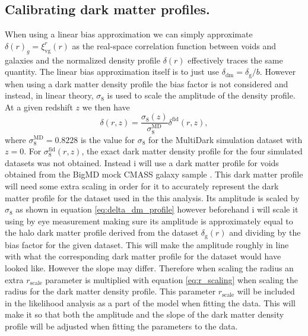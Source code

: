 \subsection{Calibrating dark matter profiles.}\label{sec:dm_calibrate}
When using a linear bias approximation we can simply approximate $\delta(r)_g=\xi_{\mathrm{vg}}^r(r)$ as the real-space correlation function between voids and galaxies and the normalized density profile $\delta(r)$ effectively traces the same quantity. The linear bias approximation itself is to just use $\delta_{\mathrm{dm}}=\delta_\mathrm{g}/b$. However when using a dark matter density profile the bias factor is not considered and instead, in linear theory, $\sigma_8$ is used to scale the amplitude of the density profile. At a given redshift $z$ we then have
\begin{equation}\label{eq:delta_dm_profile}
    \delta(r,z) = \frac{\sigma_8(z)}{\sigma_8^{\mathrm{MD}}}\delta^\mathrm{fid}(r,z),
\end{equation}
where $\sigma_8^{\mathrm{MD}}=0.8228$ is the value for $\sigma_8$ for the MultiDark simulation dataset with $z=0$. For $\sigma_8^\mathrm{fid}(r,z)$, the exact dark matter density profile for the four simulated datasets was not obtained. Instead i will use a dark matter profile for voids obtained from the BigMD mock CMASS galaxy sample \cite{Dawson_2012}. This dark matter profile will need some extra scaling in order for it to accurately represent the dark matter profile for the dataset used in the this analysis. Its amplitude is scaled by $\sigma_8$ as shown in equation \ref{eq:delta_dm_profile} however beforehand i will scale it using by eye measurement making sure its amplitude is approximately equal to the halo dark matter profile derived from the dataset $\delta_\mathrm{g}(r)$ and dividing by the bias factor for the given dataset. This will make the amplitude roughly in line with what the corresponding dark matter profile for the dataset would have looked like. However the slope may differ. Therefore when scaling the radius an extra $r_\mathrm{scale}$ parameter is multiplied with equation \ref{eq:r_scaling} when scaling the radius for the dark matter density profile. This parameter $r_\mathrm{scale}$ will be included in the likelihood analysis as a part of the model when fitting the data. This will make it so that both the amplitude and the slope of the dark matter density profile will be adjusted when fitting the parameters to the data.
